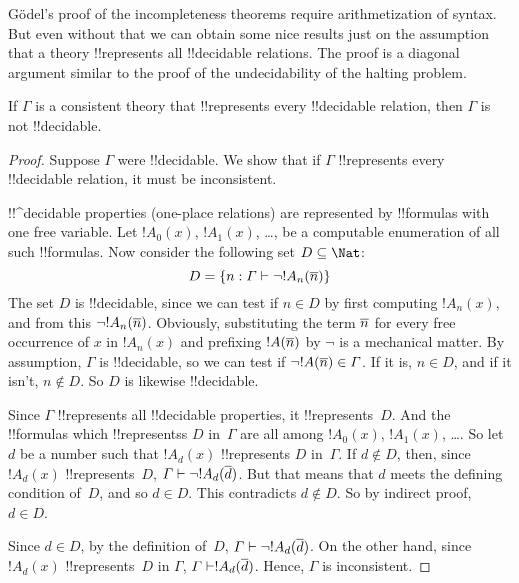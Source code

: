 \documentclass[../../../include/open-logic-section]{subfiles}
\begin{document}


G\"odel's proof of the incompleteness theorems require arithmetization
of syntax. But even without that we can obtain some nice results just
on the assumption that a theory !!{represents} all !!{decidable}
relations.  The proof is a diagonal argument similar to the proof of
the undecidability of the halting problem.

\begin{thm}
If $\Gamma$ is a consistent theory that !!{represents} every
!!{decidable} relation, then $\Gamma$ is not !!{decidable}.
\end{thm}

\begin{proof}
Suppose $\Gamma$ were !!{decidable}. We show that if $\Gamma$
!!{represents} every !!{decidable} relation, it must be inconsistent.

!!^{decidable} properties (one-place relations) are represented by
!!{formula}s with one free variable. Let $!A_0(x)$, $!A_1(x)$, \dots,
be a computable enumeration of all such !!{formula}s.  Now consider
the following set $D \subseteq \Nat$:
\[
D = \Setabs{n}{\Gamma \Proves \lnot !A_n(\num{n})}
\]
The set $D$ is !!{decidable}, since we can test if $n \in D$ by first
computing $!A_n(x)$, and from this $\lnot !A_n(\overline{n})$. Obviously,
substituting the term $\overline{n}$ for every free occurrence of $x$ in
$!A_n(x)$ and prefixing $!A(\overline{n})$ by $\lnot$ is a mechanical
matter.  By assumption, $\Gamma$ is !!{decidable}, so we can test if
$\lnot !A(\overline{n}) \in \Gamma$. If it is, $n \in D$, and if it isn't,
$n \notin D$. So $D$ is likewise !!{decidable}.

Since $\Gamma$ !!{represents} all !!{decidable} properties, it
!!{represents}~$D$.  And the !!{formula}s which !!{represents}s $D$
in~$\Gamma$ are all among $!A_0(x)$, $!A_1(x)$, \dots. So let $d$ be a
number such that $!A_d(x)$ !!{represents} $D$ in~$\Gamma$.  If $d
\notin D$, then, since $!A_d(x)$ !!{represents}~$D$, $\Gamma \Proves
\lnot !A_d(\num{d})$. But that means that $d$ meets the defining
condition of~$D$, and so $d \in D$. This contradicts $d \notin D$. So
by indirect proof, $d \in D$.

Since $d \in D$, by the definition of~$D$, $\Gamma \Proves \lnot
!A_d(\num{d})$. On the other hand, since $!A_d(x)$ !!{represents}~$D$
in $\Gamma$, $\Gamma \Proves !A_d(\num{d})$. Hence, $\Gamma$ is
inconsistent.
\end{proof}
\end{document}
